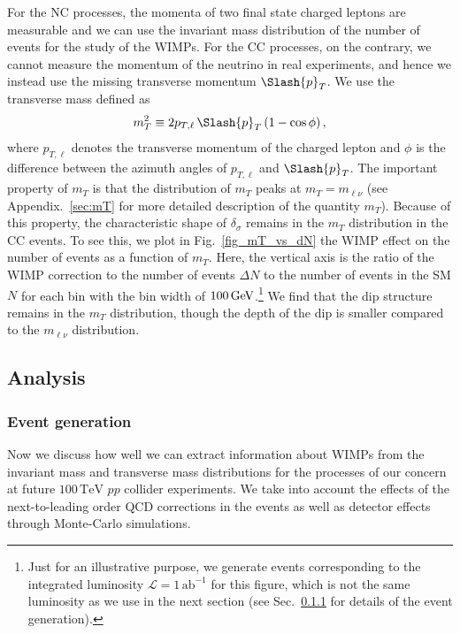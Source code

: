 \documentclass[12pt,twoside,book]{article}
\begin{document}
For the NC processes, the momenta of two final state charged leptons are measurable and we can use the invariant mass distribution of the number of events for the study of the WIMPs.
For the CC processes, on the contrary, we cannot measure the momentum of the neutrino in real experiments, and hence we instead use the missing transverse momentum $\Slash{p}_T$.
We use the transverse mass defined as
\begin{align}
  m_T^2 \equiv 2 p_{T, \ell}\,\Slash{p}_T \left( 1-\cos \phi \right),
\end{align}
where $p_{T, \ell}$ denotes the transverse momentum of the charged lepton and $\phi$ is the difference between the azimuth angles of $p_{T,\ell}$ and $\Slash{p}_T$.
The important property of $m_T$ is that the distribution of $m_T$ peaks at $m_T = m_{\ell\nu}$ (see Appendix.~\ref{sec:mT} for more detailed description of the quantity $m_T$).
Because of this property, the characteristic shape of $\delta_\sigma$ remains in the $m_T$ distribution in the CC events.
To see this, we plot in Fig.~\ref{fig_mT_vs_dN} the WIMP effect on the number of events as a function of $m_T$.
Here, the vertical axis is the ratio of the WIMP correction to the number of events $\Delta N$ to the number of events in the SM $N$ for each bin with the bin width of $100\, {\rm GeV}$.\footnote
{
  Just for an illustrative purpose, we generate events corresponding to the integrated luminosity $\mathcal{L} = 1\,\mathrm{ab}^{-1}$ for this figure, which is not the same luminosity as we use in the next section (see Sec.~\ref{sec_event} for details of the event generation).
}
We find that the dip structure remains in the $m_T$ distribution, though the depth of the dip is smaller compared to the $m_{\ell\nu}$ distribution.


\subsection{Analysis}
\label{sec:analysis}


\subsubsection{Event generation}
\label{sec_event}

Now we discuss how well we can extract information about WIMPs from the invariant mass and transverse mass distributions for the processes of our concern at future $100\,\mathrm{TeV}$ $pp$ collider experiments.
We take into account the effects of the next-to-leading order QCD corrections in the events as well as detector effects through Monte-Carlo simulations.
\end{document}
